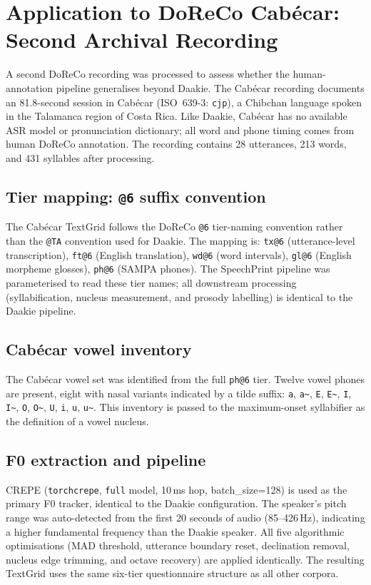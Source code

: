 \section{Application to DoReCo Cabécar: Second Archival Recording}
\label{sec:cabeca_pipeline}

A second DoReCo recording was processed to assess whether the human-annotation
pipeline generalises beyond Daakie. The Cabécar recording \cite{quesada2024cabeca}
documents an 81.8-second session in Cabécar (ISO~639-3: \texttt{cjp}), a Chibchan
language spoken in the Talamanca region of Costa Rica. Like Daakie, Cabécar has no
available ASR model or pronunciation dictionary; all word and phone timing
comes from human DoReCo annotation. The recording contains 28 utterances,
213 words, and 431 syllables after processing.

\subsection{Tier mapping: \texttt{@6} suffix convention}

The Cabécar TextGrid follows the DoReCo \texttt{@6} tier-naming convention
rather than the \texttt{@TA} convention used for Daakie. The mapping is:
\texttt{tx@6} (utterance-level transcription), \texttt{ft@6} (English
translation), \texttt{wd@6} (word intervals), \texttt{gl@6} (English morpheme
glosses), \texttt{ph@6} (SAMPA phones). The SpeechPrint pipeline was
parameterised to read these tier names; all downstream processing
(syllabification, nucleus measurement, and prosody labelling) is
identical to the Daakie pipeline.

\subsection{Cabécar vowel inventory}

The Cabécar vowel set was identified from the full \texttt{ph@6} tier. Twelve
vowel phones are present, eight with nasal variants indicated by a tilde suffix:
\texttt{a}, \texttt{a\~{}}, \texttt{E}, \texttt{E\~{}}, \texttt{I},
\texttt{I\~{}}, \texttt{O}, \texttt{O\~{}}, \texttt{U}, \texttt{i},
\texttt{u}, \texttt{u\~{}}. This inventory is passed to the maximum-onset
syllabifier as the definition of a vowel nucleus.

\subsection{F0 extraction and pipeline}

CREPE (\texttt{torchcrepe}, \texttt{full} model, 10\,ms hop, batch\_size=128)
is used as the primary F0 tracker, identical to the Daakie configuration. The
speaker's pitch range was auto-detected from the first 20 seconds of audio
(85--426\,Hz), indicating a higher fundamental frequency than the Daakie
speaker. All five algorithmic optimisations (MAD threshold, utterance boundary
reset, declination removal, nucleus edge trimming, and octave recovery) are
applied identically. The resulting TextGrid uses the same six-tier questionnaire
structure as all other corpora.

